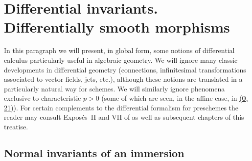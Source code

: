 \setcounter{section}{15}
\section{Differential invariants. Differentially smooth morphisms}
\label{section:IV.16}

In this paragraph we will present, in global form, some notions of differential calculus particularly useful in algebraic geometry.
We will ignore many classic developments in differential geometry (connections, infinitesimal transformations associated to vector fields, jets, etc.), although these notions are translated in a particularly natural way for schemes.
We will similarly ignore phenomena exclusive to characteristic $p>0$ (some of which are seen, in the affine case, in \hyperref[section:0.21]{(\textbf{0}, 21)}).
For certain complements to the differential formalism for preschemes the reader may consult Expos\'es~II and VII of \cite{SGA3} as well as subsequent chapters of this treatise. 


\subsection{Normal invariants of an immersion}
\label{IV.16.1}

\begin{env}[16.1.1]
\label{IV.16.1.1}
\end{env}
